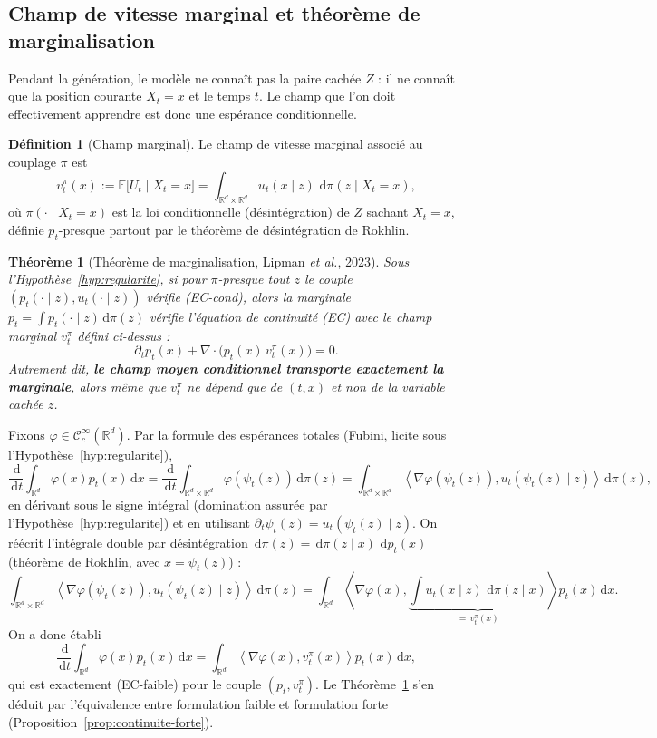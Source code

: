 \documentclass[11pt,a4paper]{article}
\makeatletter
\theoremstyle{definition}
\newtheorem{definition}{Définition}[section]
\theoremstyle{plain}
\newtheorem{theoreme}{Théorème}[section]
\theoremstyle{remark}
\providecommand{\demonstrationname}{Démonstration}
\renewenvironment{proof}[1][\demonstrationname]{\par
  \pushQED{\qed}%
  \normalfont \topsep6\p@\@plus6\p@\relax
  \trivlist
  \item[\hskip\labelsep
        \bfseries #1\@addpunct{.}]\ignorespaces
}{%
  \popQED\endtrivlist\@endpefalse
}
\newcommand{\R}{\mathbb{R}}
\newcommand{\E}{\mathbb{E}}
\newcommand{\dd}{\,\mathrm{d}}
\makeatother
\begin{document}
\subsection{Champ de vitesse marginal et théorème de marginalisation}

Pendant la génération, le modèle ne connaît pas la paire cachée $Z$ : il ne
connaît que la position courante $X_t=x$ et le temps $t$. Le champ que l'on doit
effectivement apprendre est donc une espérance conditionnelle.

\begin{definition}[Champ marginal]
Le champ de vitesse marginal associé au couplage $\pi$ est
\[
  \boxed{
  v_t^\pi(x) := \E\bigl[U_t \mid X_t=x\bigr]
  =
  \int_{\R^d\times\R^d} u_t(x\mid z)\, \dd\pi(z\mid X_t=x),
  }
\]
où $\pi(\cdot\mid X_t=x)$ est la loi conditionnelle (désintégration) de $Z$
sachant $X_t=x$, définie $p_t$-presque partout par le théorème de désintégration
de Rokhlin.
\end{definition}

\begin{theoreme}[Théorème de marginalisation, {Lipman \emph{et al.}, 2023}]\label{thm:marginalisation}
Sous l'Hypothèse~\ref{hyp:regularite}, si pour $\pi$-presque tout $z$ le couple
$(p_t(\cdot\mid z),u_t(\cdot\mid z))$ vérifie (EC-cond), alors la marginale
$p_t=\int p_t(\cdot\mid z)\dd\pi(z)$ vérifie l'équation de continuité (EC) avec
le champ marginal $v_t^\pi$ défini ci-dessus :
\[
  \partial_t p_t(x) + \nabla\cdot\bigl(p_t(x)\,v_t^\pi(x)\bigr) = 0.
\]
Autrement dit, \textbf{le champ moyen conditionnel transporte exactement la
marginale}, alors même que $v_t^\pi$ ne dépend que de $(t,x)$ et non de la
variable cachée $z$.
\end{theoreme}

\begin{proof}
Fixons $\varphi\in\mathcal{C}^\infty_c(\R^d)$. Par la formule des espérances
totales (Fubini, licite sous l'Hypothèse~\ref{hyp:regularite}),
\[
  \frac{\dd}{\dd t}\int_{\R^d}\varphi(x)p_t(x)\dd x
  =
  \frac{\dd}{\dd t}\int_{\R^d\times\R^d}\varphi(\psi_t(z))\dd\pi(z)
  =
  \int_{\R^d\times\R^d}\left\langle \nabla\varphi(\psi_t(z)),u_t(\psi_t(z)\mid z)\right\rangle\dd\pi(z),
\]
en dérivant sous le signe intégral (domination assurée par l'Hypothèse~\ref{hyp:regularite})
et en utilisant $\partial_t\psi_t(z)=u_t(\psi_t(z)\mid z)$. On réécrit l'intégrale
double par désintégration $\dd\pi(z)=\dd\pi(z\mid x)\,\dd p_t(x)$ (théorème de
Rokhlin, avec $x=\psi_t(z)$) :
\[
  \int_{\R^d\times\R^d}\left\langle \nabla\varphi(\psi_t(z)),u_t(\psi_t(z)\mid z)\right\rangle\dd\pi(z)
  =
  \int_{\R^d}\left\langle \nabla\varphi(x),
  \underbrace{\int u_t(x\mid z)\,\dd\pi(z\mid x)}_{=\,v_t^\pi(x)}
  \right\rangle p_t(x)\dd x.
\]
On a donc établi
\[
  \frac{\dd}{\dd t}\int_{\R^d}\varphi(x)p_t(x)\dd x
  =
  \int_{\R^d}\left\langle \nabla\varphi(x),v_t^\pi(x)\right\rangle p_t(x)\dd x,
\]
qui est exactement (EC-faible) pour le couple $(p_t,v_t^\pi)$. Le
Théorème~\ref{thm:marginalisation} s'en déduit par l'équivalence entre
formulation faible et formulation forte (Proposition~\ref{prop:continuite-forte}).
\end{proof}
\end{document}
